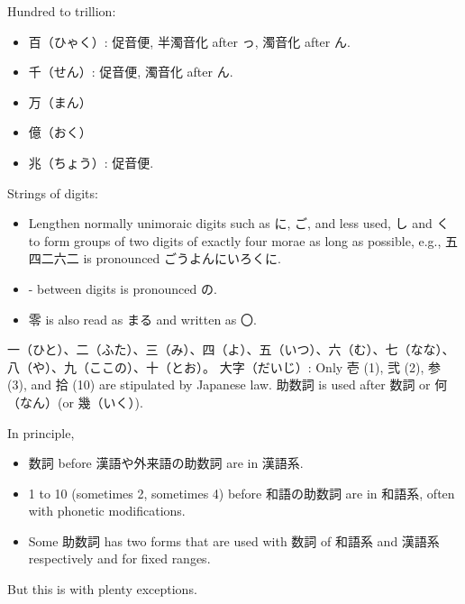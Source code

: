 \documentclass[a4paper,12pt]{article}
\begin{document}
Hundred to trillion:
\begin{itemize}
\item 百（ひゃく）: 促音便, 半濁音化 after っ, 濁音化 after ん.
\item 千（せん）: 促音便, 濁音化 after ん.
\item 万（まん）
\item 億（おく）
\item 兆（ちょう）: 促音便.
\end{itemize}
Strings of digits:
\begin{itemize}
\item Lengthen normally unimoraic digits such as に, ご, and less used, し and く to form groups of two digits of exactly four morae as long as possible, e.g., 五四二六二 is pronounced ごうよんにいろくに.
\item - between digits is pronounced の.
\item 零 is also read as まる and written as 〇.
\end{itemize}
一（ひと）、二（ふた）、三（み）、四（よ）、五（いつ）、六（む）、七（なな）、八（や）、九（ここの）、十（とお）。
大字（だいじ）: Only 壱 (1), 弐 (2), 参 (3), and 拾 (10) are stipulated by Japanese law.
助数詞 is used after 数詞 or 何（なん）(or 幾（いく）).

In principle,
\begin{itemize}
\item 数詞 before 漢語や外来語の助数詞 are in 漢語系.
\item 1 to 10 (sometimes 2, sometimes 4) before 和語の助数詞 are in 和語系, often with phonetic modifications.
\item Some 助数詞 has two forms that are used with 数詞 of 和語系 and 漢語系 respectively and for fixed ranges.
\end{itemize}
But this is with plenty exceptions.
\end{document}
